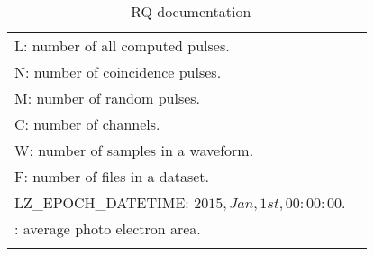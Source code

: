 \begin{center}
\begin{longtable}[!htbp]{|l||*{5}{c|}}
		
		\multicolumn{5}{m{27em}}{L: number of all computed pulses.}\\
		\multicolumn{5}{m{27em}}{N: number of coincidence pulses.}\\
		\multicolumn{5}{m{27em}}{M: number of random pulses.}\\
		\multicolumn{5}{m{27em}}{C: number of channels.}\\
		\multicolumn{5}{m{27em}}{W: number of samples in a waveform.}\\
		\multicolumn{5}{m{27em}}{F: number of files in a dataset.}\\
		\multicolumn{5}{m{27em}}{LZ\_EPOCH\_DATETIME: $2015, Jan, 1st, 00:00:00$.}\\
		\multicolumn{5}{m{27em}}{\si{\phe}: average photo electron area.}\\\hline
		\caption[\gtest\ RQ documentation]{\gtest\ RQ documentation}
		\label{RQ list}
	\end{longtable}
\end{center}





 